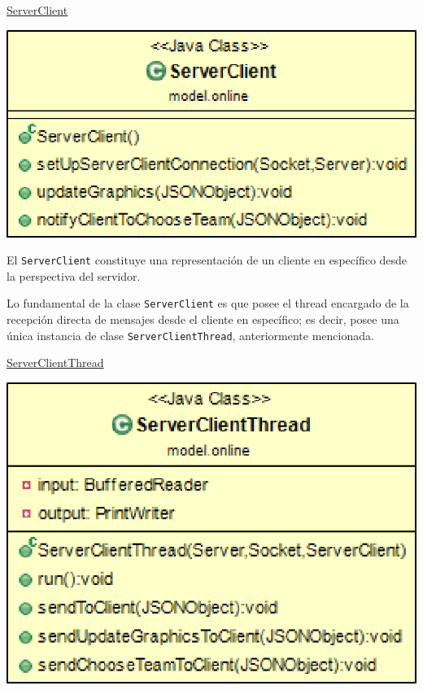 \documentclass[12pt,a4paper,openright]{book}
\theoremstyle{break}
\begin{document}
\newpage

\underline{ServerClient}

\begin{center}
\includegraphics[scale=0.3]{ServerClient-sprint7.png} 
\end{center}

El \texttt{ServerClient} constituye una representación de un cliente en específico desde la perspectiva del servidor. 

Lo fundamental de la clase \texttt{ServerClient} es que posee el thread encargado de la recepción directa de mensajes desde el cliente en específico; es decir, posee una única instancia de clase \texttt{ServerClientThread}, anteriormente mencionada.

\newpage

\underline{ServerClientThread}

\begin{center}
\includegraphics[scale=0.3]{ServerClientThread-sprint7.png} 
\end{center}
\end{document}
